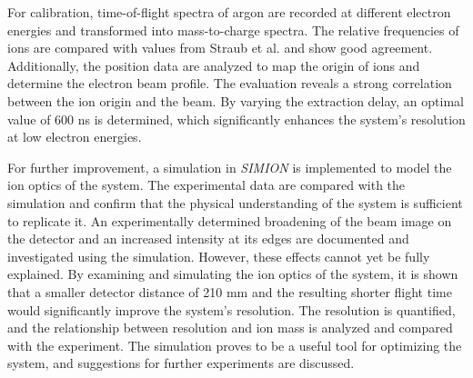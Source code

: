 For calibration, time-of-flight spectra of argon are recorded at different electron energies and transformed into mass-to-charge spectra. The relative frequencies of ions are compared with values from Straub et al. \cite{Straub} and show good agreement. Additionally, the position data are analyzed to map the origin of ions and determine the electron beam profile. The evaluation reveals a strong correlation between the ion origin and the beam. By varying the extraction delay, an optimal value of 600 ns is determined, which significantly enhances the system’s resolution at low electron energies.

For further improvement, a simulation in \textit{SIMION} is implemented to model the ion optics of the system. The experimental data are compared with the simulation and confirm that the physical understanding of the system is sufficient to replicate it. An experimentally determined broadening of the beam image on the detector and an increased intensity at its edges are documented and investigated using the simulation. However, these effects cannot yet be fully explained. By examining and simulating the ion optics of the system, it is shown that a smaller detector distance of 210 mm and the resulting shorter flight time would significantly improve the system’s resolution. The resolution is quantified, and the relationship between resolution and ion mass is analyzed and compared with the experiment. The simulation proves to be a useful tool for optimizing the system, and suggestions for further experiments are discussed.